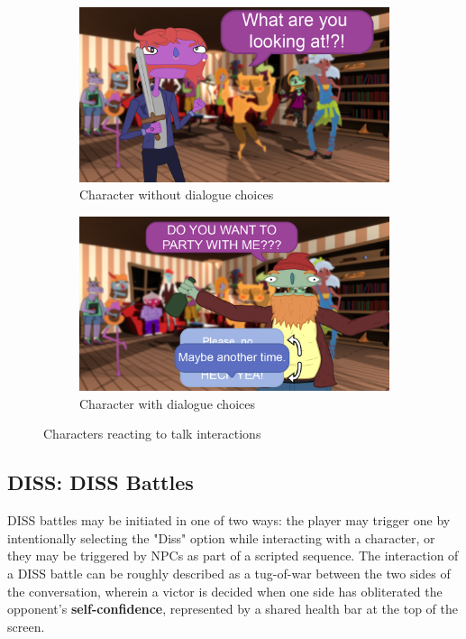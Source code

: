 \begin{figure}[H]
  \centering\begin{subfigure}{.45\textwidth}
    \centering
    \includegraphics[width=.9\linewidth]{images/UI_npc_nodialogue}
    \caption{Character without dialogue choices}
	\label{fig:speech_bubble}
  \end{subfigure}%
  \begin{subfigure}{.45\textwidth}
    \centering
    \includegraphics[width=.9\linewidth]{images/UI_npc_conversation}
    \caption{Character with dialogue choices}
	\label{fig:dialogue}
  \end{subfigure}%
  \caption{Characters reacting to talk interactions}
\end{figure}

\subsection{DISS: DISS Battles}
\label{sec:yelling_contest}

DISS battles may be initiated in one of two ways: the player may trigger one by intentionally selecting the "Diss" option while interacting with a character, or they may be triggered by NPCs as part of a scripted sequence. The interaction of a DISS battle can be roughly described as a tug-of-war between the two sides of the conversation, wherein a victor is decided when one side has obliterated the opponent's \textbf{self-confidence}, represented by a shared health bar at the top of the screen.

